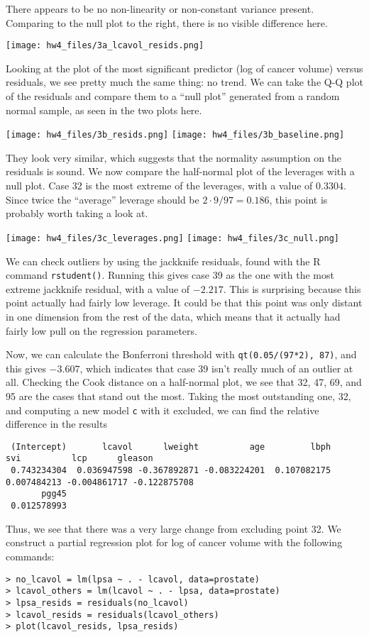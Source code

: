 \documentclass{article}
\begin{document}
There appears to be no non-linearity or non-constant variance present. Comparing to the null plot to the right, there is no visible difference here.

\noindent\texttt{[image: hw4\_files/3a\_lcavol\_resids.png]}

Looking at the plot of the most significant predictor (log of cancer volume) versus residuals, we see pretty much the same thing: no trend.
We can take the Q-Q plot of the residuals and compare them to a ``null plot'' generated from a random normal sample, as seen in the two plots here.

\noindent\texttt{[image: hw4\_files/3b\_resids.png]}
\texttt{[image: hw4\_files/3b\_baseline.png]}

They look very similar, which suggests that the normality assumption on the residuals is sound.
We now compare the half-normal plot of the leverages with a null plot. Case 32 is the most extreme of the leverages, with a value of $0.3304$. Since twice the ``average'' leverage should be $2\cdot9/97=0.186$, this point is probably worth taking a look at.

\noindent\texttt{[image: hw4\_files/3c\_leverages.png]}
\texttt{[image: hw4\_files/3c\_null.png]}

We can check outliers by using the jackknife residuals, found with the R command \verb|rstudent()|. Running this gives case 39 as the one with the most extreme jackknife residual, with a value of $-2.217$. This is surprising because this point actually had fairly low leverage. It could be that this point was only distant in one dimension from the rest of the data, which means that it actually had fairly low pull on the regression parameters. 

Now, we can calculate the Bonferroni threshold with \verb|qt(0.05/(97*2), 87)|, and this gives $-3.607$, which indicates that case 39 isn't really much of an outlier at all.
Checking the Cook distance on a half-normal plot, we see that 32, 47, 69, and 95 are the cases that stand out the most. Taking the most outstanding one, 32, and computing a new model \verb|c| with it excluded, we can find the relative difference in the results
\begin{verbatim}
 (Intercept)       lcavol      lweight          age         lbph          svi          lcp      gleason 
 0.743234304  0.036947598 -0.367892871 -0.083224201  0.107082175  0.007484213 -0.004861717 -0.122875708 
       pgg45 
 0.012578993
\end{verbatim}
Thus, we see that there was a very large change from excluding point 32.
We construct a partial regression plot for log of cancer volume with the following commands:
\begin{verbatim}
> no_lcavol = lm(lpsa ~ . - lcavol, data=prostate)
> lcavol_others = lm(lcavol ~ . - lpsa, data=prostate)
> lpsa_resids = residuals(no_lcavol)
> lcavol_resids = residuals(lcavol_others)
> plot(lcavol_resids, lpsa_resids)
\end{verbatim}
\end{document}
